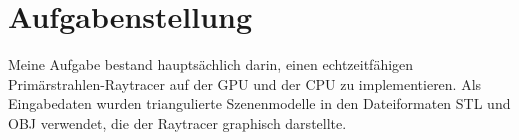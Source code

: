 \documentclass[crop=false]{standalone}
\begin{document}
  \section{Aufgabenstellung} %
  \label{sec:aufgabenstellung}
    Meine Aufgabe bestand hauptsächlich darin, einen echtzeitfähigen Primärstrahlen-Raytracer auf der GPU und der CPU zu implementieren.
    Als Eingabedaten wurden triangulierte Szenenmodelle in den Dateiformaten STL und OBJ verwendet, die der Raytracer graphisch darstellte.
\end{document}

